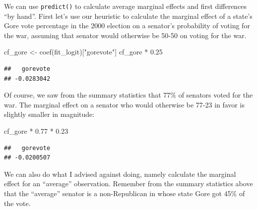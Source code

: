 \documentclass[
  12pt,
  oneside,openany]{book}
\newenvironment{Shaded}{\begin{snugshade}}{\end{snugshade}}
\newcommand{\AttributeTok}[1]{\textcolor[rgb]{0.77,0.63,0.00}{#1}}
\newcommand{\ConstantTok}[1]{\textcolor[rgb]{0.00,0.00,0.00}{#1}}
\newcommand{\FloatTok}[1]{\textcolor[rgb]{0.00,0.00,0.81}{#1}}
\newcommand{\FunctionTok}[1]{\textcolor[rgb]{0.00,0.00,0.00}{#1}}
\newcommand{\NormalTok}[1]{#1}
\newcommand{\OtherTok}[1]{\textcolor[rgb]{0.56,0.35,0.01}{#1}}
\newcommand{\SpecialCharTok}[1]{\textcolor[rgb]{0.00,0.00,0.00}{#1}}
\newcommand{\StringTok}[1]{\textcolor[rgb]{0.31,0.60,0.02}{#1}}
\begin{document}
We can use \texttt{predict()} to calculate average marginal effects and first differences ``by hand''.
First let's use our heuristic to calculate the marginal effect of a state's Gore vote percentage in the 2000 election on a senator's probability of voting for the war, assuming that senator would otherwise be 50-50 on voting for the war.

\begin{Shaded}
\begin{Highlighting}[]
\NormalTok{cf\_gore }\OtherTok{\textless{}{-}} \FunctionTok{coef}\NormalTok{(fit\_logit)[}\StringTok{"gorevote"}\NormalTok{]}
\NormalTok{cf\_gore }\SpecialCharTok{*} \FloatTok{0.25}
\end{Highlighting}
\end{Shaded}

\begin{verbatim}
##   gorevote 
## -0.0283042
\end{verbatim}

Of course, we saw from the summary statistics that 77\% of senators voted for the war.
The marginal effect on a senator who would otherwise be 77-23 in favor is slightly smaller in magnitude:

\begin{Shaded}
\begin{Highlighting}[]
\NormalTok{cf\_gore }\SpecialCharTok{*} \FloatTok{0.77} \SpecialCharTok{*} \FloatTok{0.23}
\end{Highlighting}
\end{Shaded}

\begin{verbatim}
##   gorevote 
## -0.0200507
\end{verbatim}

We can also do what I advised against doing, namely calculate the marginal effect for an ``average'' observation.
Remember from the summary statistics above that the ``average'' senator is a non-Republican in whose state Gore got 45\% of the vote.

\begin{Shaded}
\end{Shaded}
\end{document}
